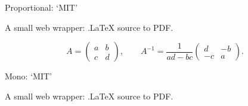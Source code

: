 \documentclass{article}
\begin{document}
Proportional: `MIT'\par
A small web wrapper: .LaTeX source to PDF.\par
\[
  A=\left(\begin{array}{cc}a&b\\c&d\end{array}\right),\qquad
  A^{-1}=\frac{1}{ad-bc}\left(\begin{array}{rr}d&-b\\-c&a\end{array}\right).
\]
\bigskip
{%
Mono: `MIT'\par
A small web wrapper: .LaTeX source to PDF.}
\end{document}
